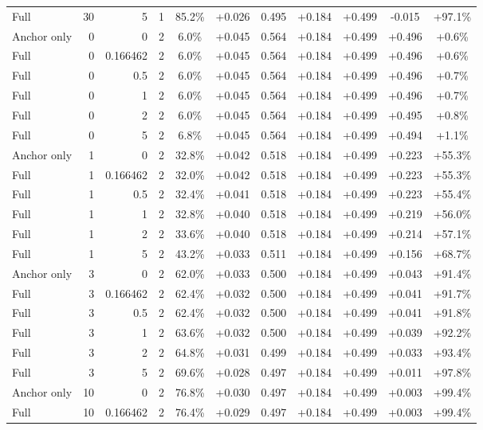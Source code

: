 \begin{table}[htbp]
\begin{tabular}{lrrrccccccc}
Full & 30 & 5 & 1 & 85.2\% & +0.026 & 0.495 & +0.184 & +0.499 & -0.015 & +97.1\% \\
Anchor only & 0 & 0 & 2 & 6.0\% & +0.045 & 0.564 & +0.184 & +0.499 & +0.496 & +0.6\% \\
Full & 0 & 0.166462 & 2 & 6.0\% & +0.045 & 0.564 & +0.184 & +0.499 & +0.496 & +0.6\% \\
Full & 0 & 0.5 & 2 & 6.0\% & +0.045 & 0.564 & +0.184 & +0.499 & +0.496 & +0.7\% \\
Full & 0 & 1 & 2 & 6.0\% & +0.045 & 0.564 & +0.184 & +0.499 & +0.496 & +0.7\% \\
Full & 0 & 2 & 2 & 6.0\% & +0.045 & 0.564 & +0.184 & +0.499 & +0.495 & +0.8\% \\
Full & 0 & 5 & 2 & 6.8\% & +0.045 & 0.564 & +0.184 & +0.499 & +0.494 & +1.1\% \\
Anchor only & 1 & 0 & 2 & 32.8\% & +0.042 & 0.518 & +0.184 & +0.499 & +0.223 & +55.3\% \\
Full & 1 & 0.166462 & 2 & 32.0\% & +0.042 & 0.518 & +0.184 & +0.499 & +0.223 & +55.3\% \\
Full & 1 & 0.5 & 2 & 32.4\% & +0.041 & 0.518 & +0.184 & +0.499 & +0.223 & +55.4\% \\
Full & 1 & 1 & 2 & 32.8\% & +0.040 & 0.518 & +0.184 & +0.499 & +0.219 & +56.0\% \\
Full & 1 & 2 & 2 & 33.6\% & +0.040 & 0.518 & +0.184 & +0.499 & +0.214 & +57.1\% \\
Full & 1 & 5 & 2 & 43.2\% & +0.033 & 0.511 & +0.184 & +0.499 & +0.156 & +68.7\% \\
Anchor only & 3 & 0 & 2 & 62.0\% & +0.033 & 0.500 & +0.184 & +0.499 & +0.043 & +91.4\% \\
Full & 3 & 0.166462 & 2 & 62.4\% & +0.032 & 0.500 & +0.184 & +0.499 & +0.041 & +91.7\% \\
Full & 3 & 0.5 & 2 & 62.4\% & +0.032 & 0.500 & +0.184 & +0.499 & +0.041 & +91.8\% \\
Full & 3 & 1 & 2 & 63.6\% & +0.032 & 0.500 & +0.184 & +0.499 & +0.039 & +92.2\% \\
Full & 3 & 2 & 2 & 64.8\% & +0.031 & 0.499 & +0.184 & +0.499 & +0.033 & +93.4\% \\
Full & 3 & 5 & 2 & 69.6\% & +0.028 & 0.497 & +0.184 & +0.499 & +0.011 & +97.8\% \\
Anchor only & 10 & 0 & 2 & 76.8\% & +0.030 & 0.497 & +0.184 & +0.499 & +0.003 & +99.4\% \\
Full & 10 & 0.166462 & 2 & 76.4\% & +0.029 & 0.497 & +0.184 & +0.499 & +0.003 & +99.4\% \\

\end{tabular}
\end{table}
